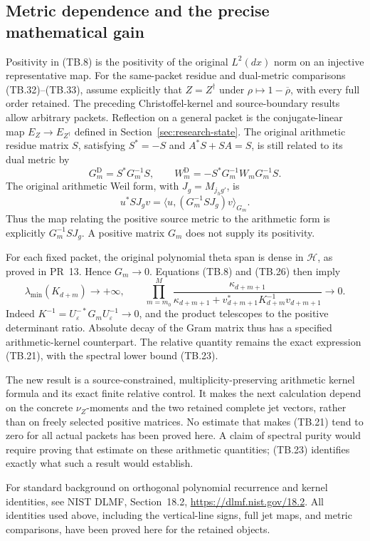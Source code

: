 \subsection{Metric dependence and the precise mathematical gain}

Positivity in (TB.8) is the positivity of the original
\(L^2(dx)\) norm on an injective representative map.
For the same-packet residue and dual-metric comparisons
(TB.32)--(TB.33), assume explicitly that
\(Z=Z^\dagger\) under \(\rho\mapsto1-\overline\rho\),
with every full order retained. The preceding Christoffel-kernel
and source-boundary results allow arbitrary packets. Reflection
on a general packet is the conjugate-linear map
\(E_Z\to E_{Z^\dagger}\) defined in Section~\ref{sec:research-state}.
The original arithmetic residue matrix \(S\), satisfying
\(S^*=-S\) and \(A^*S+SA=S\), is still related to its dual metric by
\[
 G_m^{\mathrm D}=S^*G_m^{-1}S,\qquad
 W_m^{\mathrm D}=-S^*G_m^{-1}W_mG_m^{-1}S.
 \tag{TB.32}
\]
The original arithmetic Weil form, with \(J_g=M_{j_hg'}\), is
\[
 u^*SJ_gv=\langle u,(G_m^{-1}SJ_g)v\rangle_{G_m}.
 \tag{TB.33}
\]
Thus the map relating the positive source metric to the arithmetic
form is explicitly \(G_m^{-1}SJ_g\).  A positive matrix
\(G_m\) does not supply its positivity.

For each fixed packet, the original polynomial theta span is
dense in \(\mathcal H\), as proved in PR~13.  Hence \(G_m\to0\).
Equations (TB.8) and (TB.26) then imply
\[
 \lambda_{\min}(K_{d+m})\longrightarrow+\infty,\qquad
 \prod_{m=m_0}^{M}\frac{\kappa_{d+m+1}}
 {\kappa_{d+m+1}+v_{d+m+1}^*K_{d+m}^{-1}v_{d+m+1}}
 \longrightarrow0.
 \tag{TB.34}
\]
Indeed \(K^{-1}=U_\varepsilon^{-*}G_mU_\varepsilon^{-1}\to0\),
and the product telescopes to the positive determinant ratio.
Absolute decay of the Gram matrix thus has a specified
arithmetic-kernel counterpart.  The relative quantity remains
the exact expression (TB.21), with the spectral lower bound
(TB.23).

The new result is a source-constrained, multiplicity-preserving
arithmetic kernel formula and its exact finite relative control.
It makes the next calculation depend on the concrete
\(\nu_Z\)-moments and the two retained complete jet vectors,
rather than on freely selected positive matrices.
No estimate that makes (TB.21) tend to zero for all actual
packets has been proved here.  A claim of spectral purity would
require proving that estimate on these arithmetic quantities;
(TB.23) identifies exactly what such a result would establish.

For standard background on orthogonal polynomial recurrence and
kernel identities, see NIST DLMF, Section~18.2,
\url{https://dlmf.nist.gov/18.2}.  All identities used above,
including the vertical-line signs, full jet maps, and metric
comparisons, have been proved here for the retained objects.

